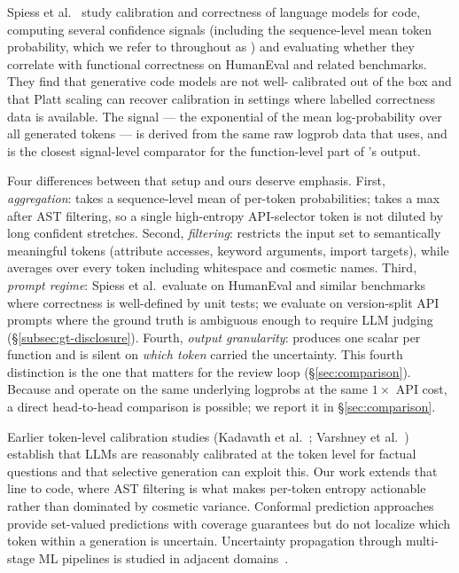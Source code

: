 Spiess et al.~\cite{spiess2025calibration} study calibration and
correctness of language models for code, computing several confidence
signals (including the sequence-level mean token probability, which
we refer to throughout as \papg) and evaluating whether they
correlate with functional correctness on HumanEval and related
benchmarks. They find that generative code models are not well-%
calibrated out of the box and that Platt scaling can recover
calibration in settings where labelled correctness data is available.
The \papg signal --- the exponential of the mean log-probability over
all generated tokens --- is derived from the same raw logprob data
that \eps uses, and is the closest signal-level comparator for the
function-level part of \eps's output.

Four differences between that setup and ours deserve emphasis. First,
\emph{aggregation}: \papg takes a sequence-level mean of per-token
probabilities; \eps takes a max after AST filtering, so a single
high-entropy API-selector token is not diluted by long confident
stretches. Second, \emph{filtering}: \eps restricts the input set to
semantically meaningful tokens (attribute accesses, keyword arguments,
import targets), while \papg averages over every token including
whitespace and cosmetic names. Third, \emph{prompt regime}: Spiess et
al.\ evaluate on HumanEval and similar benchmarks where correctness
is well-defined by unit tests; we evaluate on version-split API
prompts where the ground truth is ambiguous enough to require LLM
judging (\S\ref{subsec:gt-disclosure}). Fourth, \emph{output
granularity}: \papg produces one scalar per function and is silent on
\emph{which token} carried the uncertainty. This fourth distinction
is the one that matters for the review loop (\S\ref{sec:comparison}).
Because \papg and \eps operate on the same underlying logprobs at the
same $1\times$ API cost, a direct head-to-head comparison is
possible; we report it in \S\ref{sec:comparison}.

Earlier token-level calibration studies (Kadavath et
al.~\cite{kadavath2022language}; Varshney et
al.~\cite{varshney2023stitch}) establish that LLMs are reasonably
calibrated at the token level for factual questions and that
selective generation can exploit this. Our work extends that line to
code, where AST filtering is what makes per-token entropy actionable
rather than dominated by cosmetic variance. Conformal prediction
approaches~\cite{quach2023conformal,angelopoulos2022conformal}
provide set-valued predictions with coverage guarantees but do not
localize which token within a generation is uncertain. Uncertainty
propagation through multi-stage ML pipelines is studied in adjacent
domains~\cite{jungo2020analyzing}.

